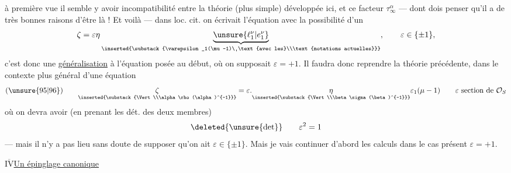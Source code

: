 à première vue il semble y avoir incompatibilité entre la théorie (plus simple) développée ici, et ce facteur $\tau_\infty^\alpha$ --- dont  dois penser qu'il a de très bonnes raisons d'être là ! Et voilà --- dans loc. cit. on écrivait l'équation   avec la possibilité d'un 
\[
\zeta=\varepsilon\eta
\underbrace{\unsure{\ell_1^\nu|e_1^\nu}}_{\inserted{\substack{\varepsilon_1(\mu-1)\ \text{avec les}\\\text{notations actuelles}}}},
\qquad\varepsilon\in\{\pm1\},
\]
c'est donc une \uline{généralisation}  à l'équation posée au début, où on supposait $\varepsilon=+1$.
Il faudra donc  reprendre la théorie précédente, dans le contexte plus général d'une équation
\[
(\unsure{95|96})\qquad
\underset{\inserted{\substack{\Vert\\\alpha\rho(\alpha)^{-1}}}}{\zeta}
=\varepsilon.\underset{\inserted{\substack{\Vert\\\beta\sigma(\beta)^{-1}}}}{\eta}\varepsilon_1(\mu-1)
\qquad\varepsilon\ \text{section de }\mathcal O_S
\]
où on devra avoir (en prenant les dét. des deux membres) 
\[
\deleted{\unsure{\det}}\qquad\varepsilon^2=1
\]
--- mais il n'y a pas lieu sans doute de supposer qu'on ait $\varepsilon\in\{\pm1\}$. Mais je vais continuer d'abord les calculs dans le cas présent $\varepsilon=+1$.



\uline{$\overline{\mathrm{IV}}$}\qquad\uline{Un épinglage canonique}

